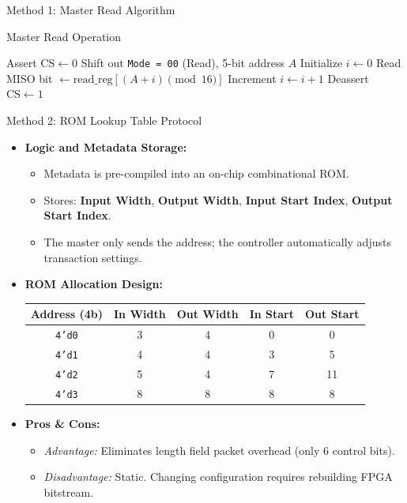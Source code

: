 \documentclass{beamer}
\begin{document}
\begin{frame}[fragile]{Method 1: Master Read Algorithm}
  \begin{block}{Master Read Operation}
    \begin{algorithmic}[1]
      \STATE Assert $\text{CS} \leftarrow 0$
      \STATE Shift out \texttt{Mode = 00} (Read), 5-bit address $A$
      \STATE Initialize $i \leftarrow 0$
        \STATE Read MISO bit $\leftarrow \text{read\_reg}[(A + i) \pmod{16}]$
        \STATE Increment $i \leftarrow i + 1$
      \ENDWHILE
      \STATE Deassert $\text{CS} \leftarrow 1$
    \end{algorithmic}
  \end{block}
\end{frame}

\begin{frame}{Method 2: ROM Lookup Table Protocol}
  \begin{itemize}
    \item \textbf{Logic and Metadata Storage:}
    \begin{itemize}
      \item Metadata is pre-compiled into an on-chip combinational ROM.
      \item Stores: \textbf{Input Width}, \textbf{Output Width}, \textbf{Input Start Index}, \textbf{Output Start Index}.
      \item The master only sends the address; the controller automatically adjusts transaction settings.
    \end{itemize}
    \item \textbf{ROM Allocation Design:}
    \begin{table}
      \centering\tiny
      \begin{tabular}{ccccc}
        \toprule
        \textbf{Address (4b)} & \textbf{In Width} & \textbf{Out Width} & \textbf{In Start} & \textbf{Out Start} \\
        \midrule
        \texttt{4'd0} & 3 & 4 & 0 & 0 \\
        \texttt{4'd1} & 4 & 4 & 3 & 5 \\
        \texttt{4'd2} & 5 & 4 & 7 & 11 \\
        \texttt{4'd3} & 8 & 8 & 8 & 8 \\
        \bottomrule
      \end{tabular}
    \end{table}
    \item \textbf{Pros \& Cons:}
    \begin{itemize}
      \item \textit{Advantage:} Eliminates length field packet overhead (only 6 control bits).
      \item \textit{Disadvantage:} Static. Changing configuration requires rebuilding FPGA bitstream.
    \end{itemize}
  \end{itemize}
\end{frame}
\end{document}
